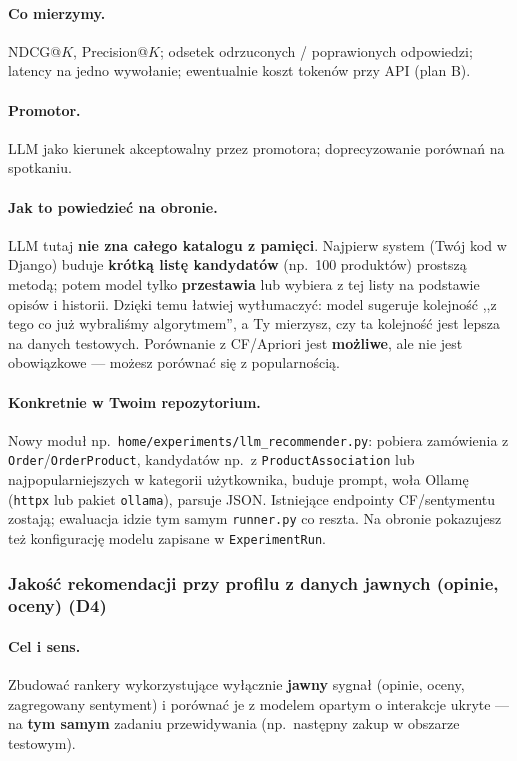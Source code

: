 \documentclass[a4paper,11pt]{article}
\newcommand{\code}[1]{\texttt{\small #1}}
\begin{document}
\paragraph{Co mierzymy.}
NDCG@$K$, Precision@$K$; odsetek odrzuconych / poprawionych odpowiedzi; latency na jedno wywołanie; ewentualnie koszt tokenów przy API (plan B).

\paragraph{Promotor.}
LLM jako kierunek akceptowalny przez promotora; doprecyzowanie porównań na spotkaniu.

\paragraph{Jak to powiedzieć na obronie.}
LLM tutaj \textbf{nie zna całego katalogu z pamięci}. Najpierw system (Twój kod w Django) buduje \textbf{krótką listę kandydatów} (np.\ 100 produktów) prostszą metodą; potem model tylko \textbf{przestawia} lub wybiera z tej listy na podstawie opisów i historii. Dzięki temu łatwiej wytłumaczyć: model sugeruje kolejność ,,z tego co już wybraliśmy algorytmem'', a Ty mierzysz, czy ta kolejność jest lepsza na danych testowych. Porównanie z CF/Apriori jest \textbf{możliwe}, ale nie jest obowiązkowe --- możesz porównać się z popularnością.

\paragraph{Konkretnie w Twoim repozytorium.}
Nowy moduł np.\ \code{home/experiments/llm\_recommender.py}: pobiera zamówienia z \code{Order}/\code{OrderProduct}, kandydatów np.\ z \code{ProductAssociation} lub najpopularniejszych w kategorii użytkownika, buduje prompt, woła Ollamę (\code{httpx} lub pakiet \code{ollama}), parsuje JSON. Istniejące endpointy CF/sentymentu zostają; ewaluacja idzie tym samym \code{runner.py} co reszta. Na obronie pokazujesz też konfigurację modelu zapisane w \code{ExperimentRun}.

\subsubsection{Jakość rekomendacji przy profilu z danych jawnych (opinie, oceny) (\textbf{D4})}

\paragraph{Cel i sens.}
Zbudować rankery wykorzystujące wyłącznie \textbf{jawny} sygnał (opinie, oceny, zagregowany sentyment) i porównać je z modelem opartym o interakcje ukryte --- na \textbf{tym samym} zadaniu przewidywania (np.\ następny zakup w obszarze testowym).
\end{document}
